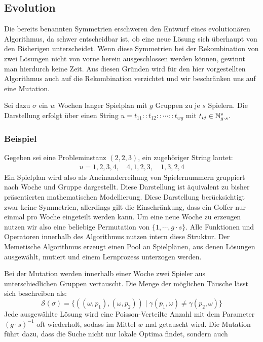 \subsection{Evolution}
Die bereits benannten Symmetrien erschweren den Entwurf eines evolutionären Algorithmus, da schwer entscheidbar ist, ob eine neue Lösung sich überhaupt von den Bisherigen unterscheidet.
Wenn diese Symmetrien bei der Rekombination von zwei Lösungen nicht von vorne herein ausgeschlossen werden können, gewinnt man hierdurch keine Zeit. 
Aus diesen Gründen wird für den hier vorgestellten Algorithmus auch auf die Rekombination verzichtet und wir beschränken uns auf eine Mutation. 

Sei dazu $\sigma$ ein $w$ Wochen langer Spielplan mit $g$ Gruppen zu je $s$ Spielern. Die Darstellung erfolgt über einen String $u = t_{11} :: t_{12} :: \cdots :: t_{wg}$ mit $t_{ij} \in \mathbb{N}_{g \cdot s}^s$.

\subsubsection{Beispiel}
Gegeben sei eine Probleminstanz $(2, 2, 3)$, ein zugehöriger String lautet:
\begin{equation}
\begin{split} 
  u = 1, 2, 3, 4,\quad 4, 1, 2, 3,\quad 1, 3, 2, 4
\end{split}
\end{equation}
Ein Spielplan wird also als Aneinanderreihung von Spielernummern gruppiert nach Woche und Gruppe dargestellt. Diese Darstellung ist äquivalent zu bisher präsentierten mathematischen Modellierung.
Diese Darstellung berücksichtigt zwar keine Symmetrien, allerdings gilt die Einschränkung, dass ein Golfer nur einmal pro Woche eingeteilt werden kann. 
Um eine neue Woche zu erzeugen nutzen wir also eine beliebige Permutation von $\{ 1, \cdots, g \cdot s\}$. Alle Funktionen und Operatoren innerhalb des Algorithmus nutzen intern diese Struktur. 
Der Memetische Algorithmus erzeugt einen Pool an Spielplänen, aus denen Lösungen ausgewählt, mutiert und einem Lernprozess unterzogen werden.

Bei der Mutation werden innerhalb einer Woche zwei Spieler aus unterschiedlichen Gruppen vertauscht. Die Menge der möglichen Täusche lässt sich beschreiben als:
\begin{equation}
  \mathcal{S}(\sigma) = \{ ((\omega, p_1), (\omega, p_2)) \;|\; \gamma(p_1, \omega) \neq \gamma(p_2, \omega) \}
\end{equation}
Jede ausgewählte Lösung wird eine Poisson-Verteilte Anzahl mit dem Parameter $(g \cdot s)^{-1}$ oft wiederholt, sodass im Mittel $w$ mal getauscht wird.
Die Mutation führt dazu, dass die Suche nicht nur lokale Optima findet, sondern auch



